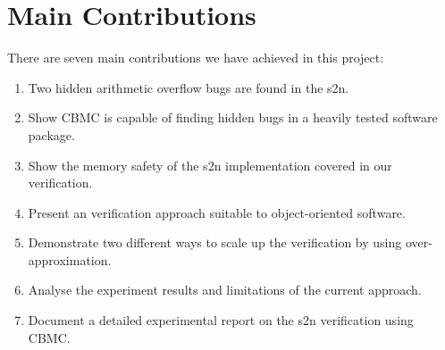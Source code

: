 





\section{Main Contributions}
There are seven main contributions we have achieved in this project:
\begin{enumerate}
    \item Two hidden arithmetic overflow bugs are found in the s2n.
    \item Show CBMC is capable of finding hidden bugs in a heavily tested software package.
    \item Show the memory safety of the s2n implementation covered in our verification.
    \item Present an verification approach suitable to object-oriented software.
    \item Demonstrate two different ways to scale up the verification by using over-approximation. 
    \item Analyse the experiment results and limitations of the current approach.
    \item Document a detailed experimental report on the s2n verification using CBMC.
\end{enumerate}


